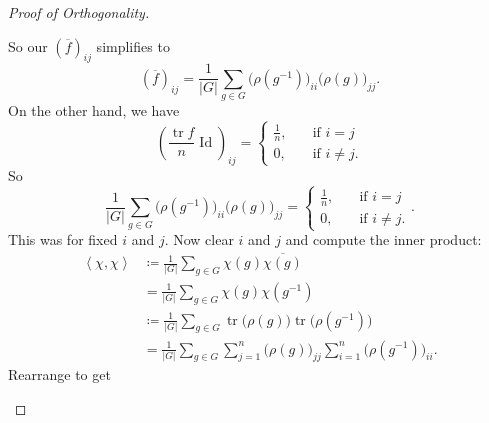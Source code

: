 \documentclass[12pt]{article}
\newcommand\inv[1]{#1^{-1}}
\newcommand{\vbrack}[1]{\left \langle #1 \right \rangle}
\theoremstyle{definition}
\DeclareMathOperator\Id{Id}
\DeclareMathOperator\tr{tr}
\begin{document}
\begin{proof}[Proof of Orthogonality]
\begin{enumerate}
\begin{equation}
        \end{equation}
        So our $\left( \overline{f} \right)_{ij}$ simplifies to 
        \begin{equation}
            \left( \overline{f} \right)_{ij} = \frac{1}{|G|} \sum\limits_{g \in G} \big( \rho \left( \inv{g} \right) \big)_{i i} \big( \rho(g) \big)_{j j}.
        \end{equation}
        On the other hand, we have 
        \begin{equation}
            \left( \frac{\tr f}{n} \Id \right)_{ij} = 
            \begin{cases}
                \frac{1}{n} , & \quad \text{if } i = j \\
                0 , & \quad \text{if } i \neq j.
            \end{cases}
        \end{equation}
        So 
        \begin{equation}
            \frac{1}{|G|} \sum\limits_{g \in G} \big( \rho \left( \inv{g} \right) \big)_{i i} \big( \rho(g) \big)_{j j} = 
            \begin{cases}
                \frac{1}{n} , & \quad \text{if } i = j \\
                0 , & \quad \text{if } i \neq j.
            \end{cases}.
        \end{equation}
        This was for fixed $i$ and $j$. Now clear $i$ and $j$ and compute the inner product: \begin{equation}
            \begin{split}
                \vbrack{\chi , \chi} & \coloneqq  \frac{1}{|G|} \sum\limits_{g \in G} \chi(g) \overline{\chi(g)} \\
                & = \frac{1}{|G|} \sum\limits_{g \in G} \chi(g) \chi \left( \inv{g} \right) \\
                & \coloneqq  \frac{1}{|G|} \sum\limits_{g \in G} \tr \big( \rho(g) \big) \tr \big( \rho \left( \inv{g} \right) \big) \\
                & = \frac{1}{|G|} \sum\limits_{g \in G} \sum\limits_{j = 1}^n \big( \rho(g) \big)_{j j} \sum\limits_{i = 1}^n \big( \rho \left( \inv{g} \right) \big)_{i i}.
            \end{split}
        \end{equation}
        Rearrange to get 
        

\end{enumerate}
\end{proof}
\end{document}
